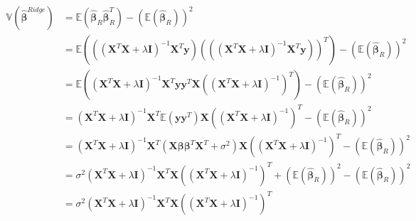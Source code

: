 \documentclass[english,notitlepage]{revtex4-1}
\begin{document}
\begin{align*}
    \mathbb{V}(\boldsymbol{\hat{\beta}}^{Ridge}) &= \mathbb{E} (\boldsymbol{\hat{\beta}}_{R} \boldsymbol{\hat{\beta}}_{R}^{T}) - (\mathbb{E} (\boldsymbol{\hat{\beta}}_{R}))^{2} \\
    &= \mathbb{E} (((\boldsymbol{X}^{T}\boldsymbol{X} + \lambda \boldsymbol{I})^{-1} \boldsymbol{X}^{T} \boldsymbol{y}) (((\boldsymbol{X}^{T}\boldsymbol{X} + \lambda \boldsymbol{I})^{-1} \boldsymbol{X}^{T} \boldsymbol{y}))^{T}) - (\mathbb{E} (\boldsymbol{\hat{\beta}}_{R}))^{2} \\
    &= \mathbb{E} ((\boldsymbol{X}^{T}\boldsymbol{X} + \lambda \boldsymbol{I})^{-1} \boldsymbol{X}^{T} \boldsymbol{y} \boldsymbol{y}^{T} \boldsymbol{X} ((\boldsymbol{X}^{T}\boldsymbol{X} + \lambda \boldsymbol{I})^{-1})^{T} ) - (\mathbb{E} (\boldsymbol{\hat{\beta}}_{R}))^{2} \\
    &= (\boldsymbol{X}^{T}\boldsymbol{X} + \lambda \boldsymbol{I})^{-1} \boldsymbol{X}^{T} \mathbb{E} (\boldsymbol{y} \boldsymbol{y}^{T} ) \boldsymbol{X} ((\boldsymbol{X}^{T}\boldsymbol{X} + \lambda \boldsymbol{I})^{-1})^{T} - (\mathbb{E} (\boldsymbol{\hat{\beta}}_{R}))^{2} \\
    &= (\boldsymbol{X}^{T}\boldsymbol{X} + \lambda \boldsymbol{I})^{-1} \boldsymbol{X}^{T} (\boldsymbol{X} \boldsymbol{\beta} \boldsymbol{\beta}^{T} \boldsymbol{X}^{T} + \sigma^{2}) \boldsymbol{X} ((\boldsymbol{X}^{T}\boldsymbol{X} + \lambda \boldsymbol{I})^{-1})^{T} - (\mathbb{E} (\boldsymbol{\hat{\beta}}_{R}))^{2} \\
    &= \sigma^{2}(\boldsymbol{X}^{T}\boldsymbol{X} + \lambda \boldsymbol{I})^{-1} \boldsymbol{X}^{T} \boldsymbol{X} ((\boldsymbol{X}^{T}\boldsymbol{X} + \lambda \boldsymbol{I})^{-1})^{T} + (\mathbb{E} (\boldsymbol{\hat{\beta}}_{R}))^{2} - (\mathbb{E} (\boldsymbol{\hat{\beta}}_{R}))^{2} \\
    &= \sigma^{2}(\boldsymbol{X}^{T}\boldsymbol{X} + \lambda \boldsymbol{I})^{-1} \boldsymbol{X}^{T} \boldsymbol{X} ((\boldsymbol{X}^{T}\boldsymbol{X} + \lambda \boldsymbol{I})^{-1})^{T} \\
\end{align*}
\end{document}
